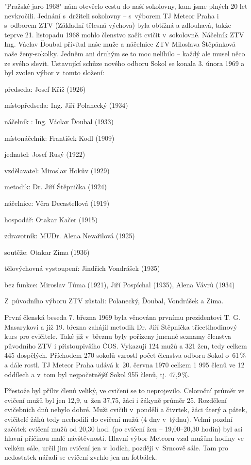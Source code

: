 \documentclass[a5paper, 11pt, twoside]{article}
\begin{document}
"Pražské jaro 1968" nám otevřelo cestu do naší sokolovny, kam jsme
plných 20 let nevkročili. Jednání s~držiteli sokolovny -- s~výborem TJ
Meteor Praha i s~odborem ZTV (Základní tělesná výchova) byla obtížná a
zdlouhavá, takže teprve 21. listopadu 1968 mohlo členstvo začít cvičit
v~sokolovně. Náčelník ZTV Ing. Václav Ďoubal přivítal naše muže a
náčelnice ZTV Miloslava Štěpánková naše ženy-sokolky. Jedněm ani druhým
se to moc nelíbilo -- každý ale musel něco ze svého slevit. Ustavující
schůze nového odboru Sokol se konala 3. února 1969 a byl zvolen výbor
v~tomto složení:

\vspace*{6pt}
předseda: Josef Kříž (1926)

místopředseda: Ing. Jiří Polanecký (1934)

náčelník : Ing. Václav Ďoubal (1933)

místonáčelník: František Kodl (1909)

jednatel: Josef Rusý (1922)

vzdělavatel: Miroslav Hokův (1929)

metodik: Dr. Jiří Štěpnička (1924)

náčelnice: Věra Decastellová (1919)

hospodář: Otakar Kačer (1915)

zdravotník: MUDr. Alena Nevařilová (1925)

soutěže: Otakar Zima (1936)

tělovýchovná vystoupení: Jindřich Vondrášek (1935)

bez funkce: Miroslav Tůma (1921), Jiří Pospíchal (1935), Alena Vávrů (1934)

Z~původního výboru ZTV zůstali: Polanecký, Ďoubal, Vondrášek a Zima.

\vspace*{6pt}

První členská beseda 7. března 1969 byla věnována prvnímu prezidentovi
T. G. Masarykovi a již 19. března zahájil metodik Dr. Jiří Štěpnička
třicetihodinový kurs pro cvičitele. Také již v~březnu byly pořízeny
jmenné seznamy členstva původního ZTV i přistoupivšího ČOS. Vykazují 124
mužů a 321 žen, tedy celkem 445 dospělých. Příchodem 270 sokolů vzrostl
počet členstva odboru Sokol o~61\,\% a dále rostl. TJ Meteor Praha udává
k~20. června 1970 celkem 1 995 členů ve 12 oddílech a v~tom byl
nejpočetnější Sokol 955 členů, tj. 47,9\,\%.

Přestože byl příliv členů veliký, ve cvičení se to neprojevilo.
Celoroční průměr ve cvičení mužů byl jen 12,9, u~žen 37,75, žáci i
žákyně průměr 25. Rozdělení cvičebních dnů nebylo dobré. Muži cvičili
v~pondělí a čtvrtek, žáci úterý a pátek, cvičitelé žáků tedy nechodili do
cvičení mužů (4 dny v~týdnu). Velmi pozdní začátek cvičení mužů od 20,30
hod. (po cvičení žen --⁠⁠⁠⁠⁠⁠ 19,00--⁠⁠⁠⁠⁠⁠20,30 hodin) byl asi hlavní příčinou malé
návštěvnosti. Hlavní výbor Meteoru vzal mužům hodiny ve velkém sále,
určil jim cvičení jen v~lodích, později v~Srncově sále. Tam pro
nedostatek nářadí se cvičení zvrhlo jen na fotbálek.
\end{document}
